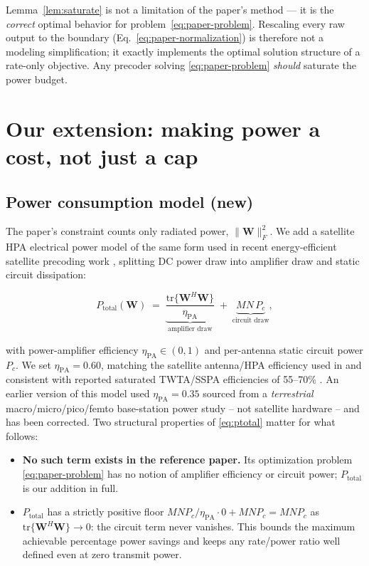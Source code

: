 \documentclass[11pt]{article}
\begin{document}
Lemma~\ref{lem:saturate} is not a limitation of the paper's method --- it is
the \emph{correct} optimal behavior for problem~\eqref{eq:paper-problem}.
Rescaling every raw output to the boundary (Eq.~\ref{eq:paper-normalization})
is therefore not a modeling simplification; it exactly implements the
optimal solution structure of a rate-only objective. Any precoder solving
\eqref{eq:paper-problem} \emph{should} saturate the power budget.

\section{Our extension: making power a cost, not just a cap}
\label{sec:our-extension}

\subsection{Power consumption model (new)}

The paper's constraint counts only radiated power, $\|\mathbf{W}\|_F^2$. We
add a satellite HPA electrical power model of the same form used in recent
energy-efficient satellite precoding work \cite{HaEtAl2024}, splitting DC
power draw into amplifier draw and static circuit dissipation:

\begin{equation}
  P_{\text{total}}(\mathbf{W}) \;=\; \underbrace{\frac{\mathrm{tr}\{\mathbf{W}^H\mathbf{W}\}}{\eta_{\text{PA}}}}_{\text{amplifier draw}}
  \;+\; \underbrace{MN\,P_c}_{\text{circuit draw}},
  \label{eq:ptotal}
\end{equation}

with power-amplifier efficiency $\eta_{\text{PA}}\in(0,1)$ and per-antenna
static circuit power $P_c$. We set $\eta_{\text{PA}}=0.60$, matching the
satellite antenna/HPA efficiency used in \cite{HaEtAl2024} and consistent
with reported saturated TWTA/SSPA efficiencies of 55--70\%
\cite{Lohmeyer2016}. An earlier version of this model used
$\eta_{\text{PA}}=0.35$ sourced from a \emph{terrestrial}
macro/micro/pico/femto base-station power study \cite{Auer2011} -- not
satellite hardware -- and has been corrected. Two structural properties of
\eqref{eq:ptotal} matter for what follows:

\begin{itemize}
  \item \textbf{No such term exists in the reference paper.} Its optimization
    problem \eqref{eq:paper-problem} has no notion of amplifier efficiency or
    circuit power; $P_{\text{total}}$ is our addition in full.
  \item $P_{\text{total}}$ has a strictly positive floor $MN P_c/\eta_{\text{PA}}\cdot 0 + MNP_c = MNP_c$
    as $\mathrm{tr}\{\mathbf{W}^H\mathbf{W}\}\to 0$: the circuit term never
    vanishes. This bounds the maximum achievable percentage power savings
    and keeps any rate/power ratio well defined even at zero transmit power.
\end{itemize}
\end{document}
